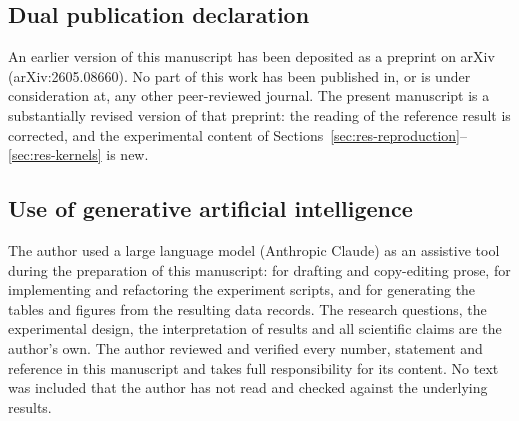 \documentclass[pdflatex,sn-mathphys-num]{sn-jnl}
\begin{document}
\subsection*{Dual publication declaration}
An earlier version of this manuscript has been deposited as a preprint on arXiv (arXiv:2605.08660). No part of this work has been published in, or is under consideration at, any other peer-reviewed journal. The present manuscript is a substantially revised version of that preprint: the reading of the reference result is corrected, and the experimental content of Sections~\ref{sec:res-reproduction}--\ref{sec:res-kernels} is new.

\subsection*{Use of generative artificial intelligence}
The author used a large language model (Anthropic Claude) as an assistive tool during the preparation of this manuscript: for drafting and copy-editing prose, for implementing and refactoring the experiment scripts, and for generating the tables and figures from the resulting data records. The research questions, the experimental design, the interpretation of results and all scientific claims are the author's own. The author reviewed and verified every number, statement and reference in this manuscript and takes full responsibility for its content. No text was included that the author has not read and checked against the underlying results.


\end{document}
